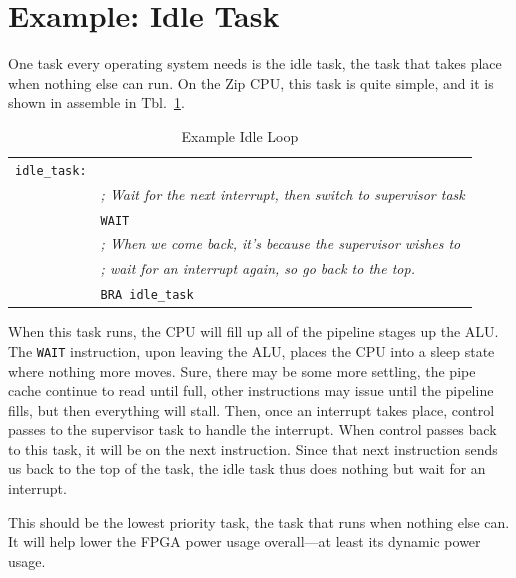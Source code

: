 \documentclass{gqtekspec}
\begin{document}
\section{Example: Idle Task}
One task every operating system needs is the idle task, the task that takes
place when nothing else can run.  On the Zip CPU, this task is quite simple,
and it is shown in assemble in Tbl.~\ref{tbl:idle-asm}.
\begin{table}\begin{center}
\begin{tabular}{ll}
{\tt idle\_task:} \\
&        {\em ; Wait for the next interrupt, then switch to supervisor task} \\
&        {\tt WAIT} \\
&        {\em ; When we come back, it's because the supervisor wishes to} \\
&        {\em ; wait for an interrupt again, so go back to the top.} \\
&        {\tt BRA idle\_task} \\
\end{tabular}
\caption{Example Idle Loop}\label{tbl:idle-asm}
\end{center}\end{table}
When this task runs, the CPU will fill up all of the pipeline stages up the
ALU.  The {\tt WAIT} instruction, upon leaving the ALU, places the CPU into
a sleep state where nothing more moves.  Sure, there may be some more settling,
the pipe cache continue to read until full, other instructions may issue until
the pipeline fills, but then everything will stall.  Then, once an interrupt
takes place, control passes to the supervisor task to handle the interrupt. 
When control passes back to this task, it will be on the next instruction.
Since that next instruction sends us back to the top of the task, the idle
task thus does nothing but wait for an interrupt.

This should be the lowest priority task, the task that runs when nothing else
can.  It will help lower the FPGA power usage overall---at least its dynamic
power usage.
\end{document}
